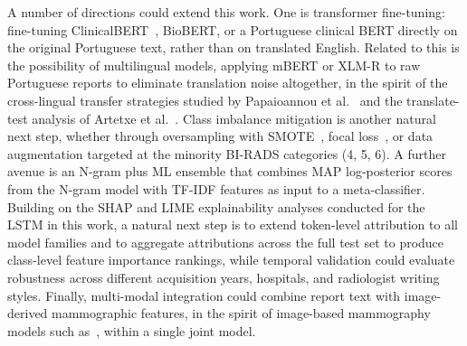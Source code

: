 \documentclass[11pt,a4paper]{article}
\begin{document}
A number of directions could extend this work. One is transformer
fine-tuning: fine-tuning ClinicalBERT~\cite{alsentzer2019publicly}, BioBERT,
or a Portuguese clinical BERT directly on the original Portuguese text,
rather than on translated English. Related to this is the possibility of
multilingual models, applying mBERT or XLM-R to raw Portuguese reports to
eliminate translation noise altogether, in the spirit of the cross-lingual
transfer strategies studied by Papaioannou et al.~\cite{papaioannou2022cross}
and the translate-test analysis of Artetxe et al.~\cite{artetxe2023revisiting}.
Class imbalance mitigation is another natural next step, whether through
oversampling with SMOTE~\cite{chawla2002smote}, focal
loss~\cite{lin2017focal}, or data augmentation targeted at the minority
BI-RADS categories (4, 5, 6). A further avenue is an N-gram plus ML ensemble
that combines MAP log-posterior scores from the N-gram model with TF-IDF
features as input to a meta-classifier. Building on the SHAP and LIME
explainability analyses conducted for the LSTM in this work, a natural next
step is to extend token-level attribution to all model families and to
aggregate attributions across the full test set to produce class-level feature
importance rankings, while temporal validation could evaluate robustness
across different acquisition years, hospitals, and radiologist writing
styles. Finally, multi-modal integration could combine report text with
image-derived mammographic features, in the spirit of image-based
mammography models such as~\cite{yala2019deep}, within a single joint
model.
\end{document}
